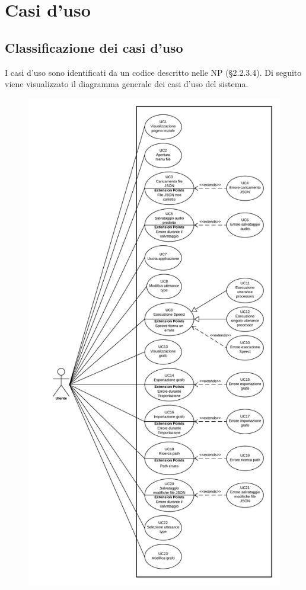 \documentclass[../AnalisideiRequisiti.tex]{subfiles}
\begin{document}

	\chapter{Casi d'uso}
	\section{Classificazione dei casi d'uso}
	I casi d'uso sono identificati da un codice descritto nelle NP (§2.2.3.4).
	Di seguito viene visualizzato il diagramma generale dei casi d'uso del sistema. 
	
	\begin{figure}[H]
	\centering	
	\includegraphics[scale=0.52]{../img/UC.png}
	

\end{figure}
\end{document}
